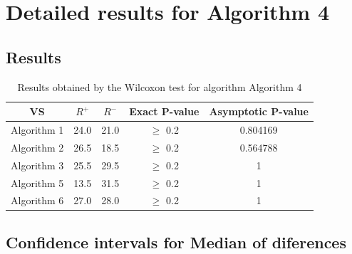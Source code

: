 \documentclass[a4paper,10pt]{article}
\begin{document}
 \clearpage 


\section{Detailed results for Algorithm 4}


\subsection{Results}

\begin{table}[!htp]
\centering\small
\begin{tabular}{
|c|c|c|c|c|}
\hline
 VS & $R^{+}$ & $R^{-}$ & Exact P-value & Asymptotic P-value \\ \hline 
Algorithm 1 & 24.0 & 21.0 & $\geq$ 0.2 & 0.804169\\ \hline 
Algorithm 2 & 26.5 & 18.5 & $\geq$ 0.2 & 0.564788\\ \hline 
Algorithm 3 & 25.5 & 29.5 & $\geq$ 0.2 & 1\\ \hline 
Algorithm 5 & 13.5 & 31.5 & $\geq$ 0.2 & 1\\ \hline 
Algorithm 6 & 27.0 & 28.0 & $\geq$ 0.2 & 1\\ \hline 

\end{tabular}
\caption{Results obtained by the Wilcoxon test for algorithm Algorithm 4}
\end{table}

\subsection{Confidence intervals for Median of diferences}
\end{document}
